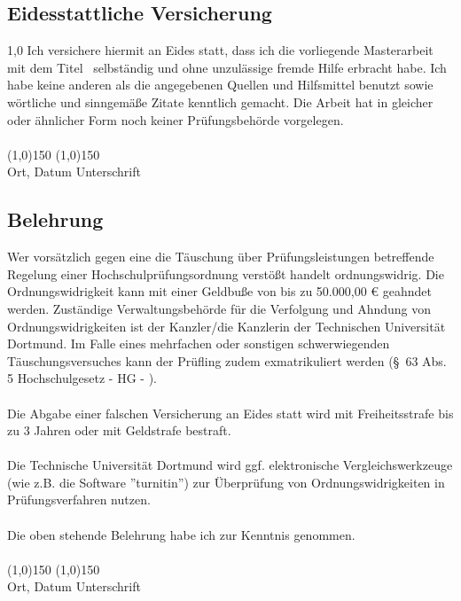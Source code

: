 \newpage
\thispagestyle{empty}
\begin{center}
\section*{Eidesstattliche Versicherung}
\end{center}
\begin{spacing}{1,0}
\noindent
Ich versichere hiermit an Eides statt, dass ich die vorliegende Masterarbeit mit dem Titel \grqq \ selbst\"andig und ohne unzulässige fremde Hilfe erbracht habe. Ich habe keine anderen als die angegebenen
Quellen und Hilfsmittel benutzt sowie w\"ortliche und sinngem\"a\ss e Zitate kenntlich gemacht.
Die Arbeit hat in gleicher oder \"ahnlicher Form noch keiner Pr\"ufungsbeh\"orde vorgelegen.
\vspace*{1cm}
\ \\
\ \\
\line(1,0){150} \hfill \line(1,0){150}\\
Ort, Datum \hfill Unterschrift \hspace*{3cm}
\vspace*{1.5cm}

\subsection*{Belehrung}
Wer vorsätzlich gegen eine die T\"auschung über Prüfungsleistungen betreffende Regelung einer Hochschulprüfungsordnung
verstößt handelt ordnungswidrig. Die Ordnungswidrigkeit kann mit einer Geldbu\ss e von bis zu 50.000,00 \euro{} geahndet werden. Zuständige Verwaltungsbehörde für die Verfolgung und Ahndung von Ordnungswidrigkeiten ist
der Kanzler/die Kanzlerin der Technischen Universit\"at Dortmund. Im Falle eines mehrfachen oder sonstigen schwerwiegenden Täuschungsversuches kann der Prüfling zudem exmatrikuliert werden (\S\ 63 Abs. 5 Hochschulgesetz - HG - ).\\
\ \\
Die Abgabe einer falschen Versicherung an Eides statt wird mit Freiheitsstrafe bis zu 3 Jahren oder mit Geldstrafe bestraft.\\
\ \\
Die Technische Universit\"at Dortmund wird ggf. elektronische Vergleichswerkzeuge (wie z.B. die Software ''turnitin'') zur \"Uberpr\"ufung von Ordnungswidrigkeiten in Pr\"ufungsverfahren nutzen.\\
\ \\
Die oben stehende Belehrung habe ich zur Kenntnis genommen.
\vspace*{1cm}
\ \\
\ \\
\line(1,0){150} \hfill \line(1,0){150}\\
Ort, Datum \hfill Unterschrift \hspace*{3cm}
\vspace*{\fill}
\end{spacing}
